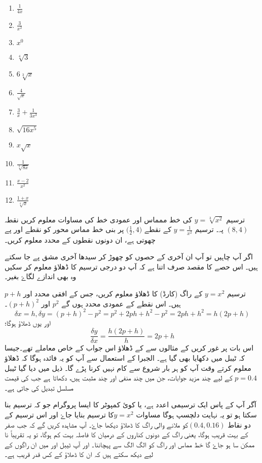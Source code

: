 \begin{multicols}{3}
\begin{enumerate}[.a]
\item \(\frac{1}{4x}\)
\item \(\frac{3}{x^2}\)
\item \(x^0\)
\item \(\sqrt[4]{3}\)
\item \(6\sqrt[3]{x}\)
\item \(\frac{4}{\sqrt{x}}\)
\item \(\frac{3}{x}+\frac{1}{3x^3}\)
\item \(\sqrt{16x^5}\)
\item \(x\sqrt{x}\)
\item \(\frac{1}{\sqrt[3]{8x}}\)
\item \(\frac{x-2}{x^2}\)
\item \(\frac{1+x}{\sqrt[4]{x}}\)
\end{enumerate}
\end{multicols}
ترسیم \(y=\sqrt[3]{x^2}\) کی خط ممماس اور عمودی خط کی مساوات معلوم کریں نقطہ \((8,4)\) پہ۔
 ترسیم \(y=\frac{1}{x^2}\) کے نقطے  \(\big( \frac{1}{2},4 \big)\) پر بنی خط مماس محور کو نقطے  اور  پے چھوتی ہے، ان دونوں نقطوں کے محدد معلوم کریں۔

 اگر آپ چاہیں تو آپ ان آخری کے حصوں کو چھوڑ کر سیدھا آخری مشق پے جا سکتے ہیں۔ اس حصے کا مقصد صرف اتنا ہے کہ آپ دو درجی ترسیم کا ڈھلاؤ معلوم کر سکیں وہ بھی اندازے لگاۓ بغیر۔

ترسیم \(y=x^2\) کے راگ (کارڈ) کا ڈھلاؤ معلوم کریں، جس کے افقی محدد  اور \(p+h\) ہیں۔ اس نقطے کے عمودی محدد ہوں گے \(p^2\) اور \((p+h)^2\)۔
\[\delta x=h, \delta y=(p+h)^2 -p^2=p^2 +2ph+h^2-p^2=2ph+h^2=h(2p+h)\]
اور یوں ڈھلاؤ ہوگا؛
\[\frac{\delta y}{\delta x}=\frac{h(2p+h)}{h}=2p+h\]
اس بات پر غور کریں کے مثالوں  سے  کے ڈھلاؤ اس جواب کے خاص معاملے تھے۔جیسا کہ ٹیبل  میں دکھایا بھی گیا ہے۔
الجبرا کے استعمال سے آپ کو یہ فائدہ ہوگا کہ ڈھلاؤ معلوم کرتے وقت آپ کو ہر بار  شروع سے کام نہیں کرنا پڑے گا۔ ذیل میں دیا گیا ٹیبل \( p=0.4  \) کے لیے چند مزید جوابات، جن میں چند منفی اور چند مثبت ہیں، دکھاتا ہے جب کی قیمت مسلسل تبدیل کی جاتی ہے۔ 

آگر آپ کے پاس ایک ترسیمی اعدد ہے، یا کوئ کمپوٹر کا ایسا پروگرام جو کہ ترسیم بنا سکتا ہو تو یہ نہایت دلچسپ ہوگا مساوات \(y=x^2\)کا ترسیم بنایا جاۓ  اور اس ترسیم کے دو نقاط \( (0.4 , 0.16) \)کو ملانے والی راگ کا ڈھلاؤ دیکھا جاۓ۔ آپ مشاہدہ کریں گے کہ جب  صفر کے بہت  قریب ہوگا، یعنی راگ کے دونوں کناروں کے درمیان کا فاصلہ بہت کم ہوگا، تو یہ تقریباً نا ممکن سا ہو جاۓ گا خط مماس اور راگ کو الگ الگ سے پہچاننا۔ اور آپ ٹیبل  اور  میں ان راگوں کے لیے دیکھ سکتے ہیں کہ ان کا ڈھلاؤ  کے کس قدر قریب ہے۔
 
